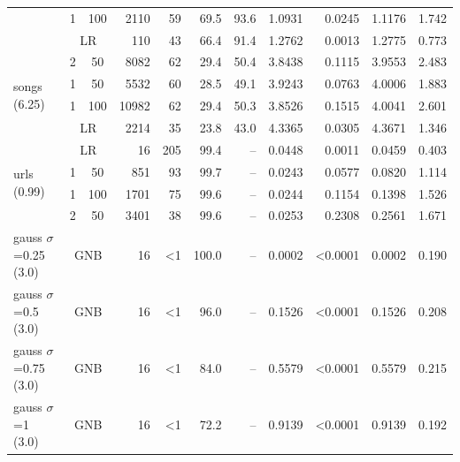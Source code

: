 \begin{tabular}{l ccr rrrrrrr}
                                            &                 1 & 100 &  2110 &  59 &  69.5 & 93.6 & 1.0931 &  0.0245 & 1.1176 & 1.742 \\
                                            &  \multicolumn{2}{c}{LR} &   110 &  43 &  66.4 & 91.4 & 1.2762 &  0.0013 & 1.2775 & 0.773 \\
      \midrule\multirow{4}{*}{songs (6.25)} &                  2 & 50 &  8082 &  62 &  29.4 & 50.4 & 3.8438 &  0.1115 & 3.9553 & 2.483 \\
                                            &                  1 & 50 &  5532 &  60 &  28.5 & 49.1 & 3.9243 &  0.0763 & 4.0006 & 1.883 \\
                                            &                 1 & 100 & 10982 &  62 &  29.4 & 50.3 & 3.8526 &  0.1515 & 4.0041 & 2.601 \\
                                            &  \multicolumn{2}{c}{LR} &  2214 &  35 &  23.8 & 43.0 & 4.3365 &  0.0305 & 4.3671 & 1.346 \\
       \midrule\multirow{4}{*}{urls (0.99)} &  \multicolumn{2}{c}{LR} &    16 & 205 &  99.4 &   -- & 0.0448 &  0.0011 & 0.0459 & 0.403 \\
                                            &                  1 & 50 &   851 &  93 &  99.7 &   -- & 0.0243 &  0.0577 & 0.0820 & 1.114 \\
                                            &                 1 & 100 &  1701 &  75 &  99.6 &   -- & 0.0244 &  0.1154 & 0.1398 & 1.526 \\
                                            &                  2 & 50 &  3401 &  38 &  99.6 &   -- & 0.0253 &  0.2308 & 0.2561 & 1.671 \\
         \midrule gauss $\sigma$=0.25 (3.0) & \multicolumn{2}{c}{GNB} &    16 &  <1 & 100.0 &   -- & 0.0002 & <0.0001 & 0.0002 & 0.190 \\
                   gauss $\sigma$=0.5 (3.0) & \multicolumn{2}{c}{GNB} &    16 &  <1 &  96.0 &   -- & 0.1526 & <0.0001 & 0.1526 & 0.208 \\
                  gauss $\sigma$=0.75 (3.0) & \multicolumn{2}{c}{GNB} &    16 &  <1 &  84.0 &   -- & 0.5579 & <0.0001 & 0.5579 & 0.215 \\
                     gauss $\sigma$=1 (3.0) & \multicolumn{2}{c}{GNB} &    16 &  <1 &  72.2 &   -- & 0.9139 & <0.0001 & 0.9139 & 0.192 \\

		\bottomrule

	\end{tabular}

